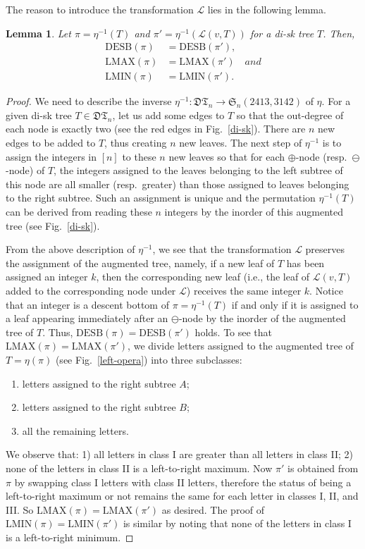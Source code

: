 \documentclass[12pt]{amsart}
\numberwithin{equation}{section}
\theoremstyle{plain}
\newtheorem{lemma}[theorem]{Lemma}
\theoremstyle{definition}
\def\S{\mathfrak{S}}
\def\LMAX{\mathrm{LMAX}}
\def\LMIN{\mathrm{LMIN}}
\def\LMIN{\mathrm{LMIN}}
\def\DESB{\mathrm{DESB}}
\def\DESB{\mathrm{DESB}}
\newcommand{\DT}{\mathfrak{DT}}
\begin{document}
The reason to introduce the transformation $\mathcal{L}$ lies in the following lemma. 
\begin{lemma}\label{lem:L}
Let $\pi=\eta^{-1}(T)$ and $\pi'=\eta^{-1}(\mathcal{L}(v,T))$ for a di-sk tree $T$. 
Then, 
\begin{align*}
\DESB(\pi)&=\DESB(\pi'),\\
\LMAX(\pi)&=\LMAX(\pi')\quad{and}\\
\LMIN(\pi)&=\LMIN(\pi').
\end{align*}
\end{lemma}
\begin{proof}
We need to describe the inverse $\eta^{-1}: \DT_{n}  \rightarrow \S_n(2413,3142)$ of $\eta$. For a given di-sk tree $
T\in\DT_n$, let us add some edges to $T$ so that the out-degree of each node is exactly two (see the red edges in Fig.~\ref{di-sk}). There are $n$ new edges to be added to $T$, thus creating $n$ new leaves. The next step of $\eta^{-1}$ is to assign the integers in $[n]$ to these $n$ new leaves so that for each $\oplus$-node (resp.~$\ominus$-node) of $T$, the integers assigned to the leaves belonging to the left subtree of this node are all smaller (resp.~greater) than those assigned to leaves belonging to the right subtree. Such an assignment is unique and the permutation $\eta^{-1}(T)$ can be derived from reading these $n$ integers by the inorder of this augmented tree (see Fig.~\ref{di-sk}).

From the above description of $\eta^{-1}$, we see that the transformation $\mathcal{L}$ preserves the assignment of the augmented tree, namely, if a new leaf of $T$ has been assigned an integer $k$, then the corresponding new leaf (i.e., the leaf of $\mathcal{L}(v,T)$ added to the corresponding node under $\mathcal{
L}$) receives the same integer $k$. Notice that an integer is a descent bottom of $\pi=\eta^{-1}(T)$ if and only if it is assigned to a leaf appearing immediately after an $\ominus$-node by the inorder of the augmented tree of $T$. Thus, $\DESB(\pi)=\DESB(\pi')$ holds. To see that $\LMAX(\pi)=\LMAX(\pi')$, we divide letters assigned to the augmented tree of $T=\eta(\pi)$ (see Fig.~\ref{left-opera}) into three subclasses:
\begin{enumerate}
	\item[I \;] letters assigned to the right subtree $A$;
	\item[II ] letters assigned to the right subtree $B$;
	\item[III] all the remaining letters.
\end{enumerate}
We observe that: 1) all letters in class I are greater than all letters in class II; 2) none of the letters in class II is a left-to-right maximum. Now $\pi'$ is obtained from $\pi$ by swapping class I letters with class II letters, therefore the status of being a left-to-right maximum or not remains the same for each letter in classes I, II, and III. So $\LMAX(\pi)=\LMAX(\pi')$ as desired. The proof of $\LMIN(\pi)=\LMIN(\pi')$ is similar by noting that none of the letters in class I is a left-to-right minimum.
\end{proof}
\end{document}
